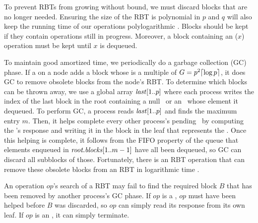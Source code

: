 To prevent RBTs from growing without bound, we must discard
blocks that are no longer needed.
Ensuring the size of the RBT is polynomial in $p$ and $q$ will 
also keep the running time of our operations polylogarithmic .
Blocks should be kept if they contain operations still in progress.
Moreover, a block containing an ($x$) operation must be kept until $x$ is dequeued.

To maintain good amortized time, we periodically do a garbage collection (GC) phase.
If a  on a node adds a block whose  is a multiple of $G=p^2\lceil \log p \rceil$, it does GC to remove obsolete blocks from the node's RBT.
To determine which blocks can be thrown away, we use a global array $\mbox{\textnormal{\textit{last}}}[1..p]$ where 
each process writes the index of the last block in the root
containing a null \dequeue\ or an \enqueue\ whose element it dequeued.
To perform GC, a process reads $\mbox{\textnormal{\textit{last}}}[1..p]$ and finds the maximum entry $m$.
Then, it helps complete every other process's pending \dequeue\ by 
computing the \dequeue's response and writing it in the block in the leaf that represents the \dequeue.
Once this helping is complete, it follows from the FIFO property of the queue that elements enqueued 
in $\mbox{\textit{root.blocks}}[1..m-1]$ have all been dequeued, so GC can discard all subblocks of those.
Fortunately, there is an  RBT  operation that can remove
these obsolete blocks from an RBT in logarithmic time \cite[Sec.~4.2]{Tar83}.

An operation $op$'s search of a RBT may fail to find the required block $B$ that has been removed 
by another process's GC phase.  If $op$
is a \dequeue, $op$ must have been helped before $B$ was discarded, so $op$ can simply read its response from
its own leaf.  If $op$ is an \enqueue, it can simply terminate.


